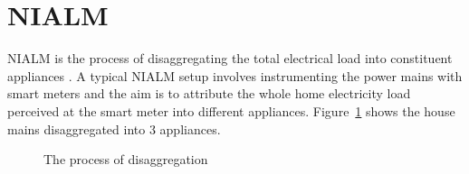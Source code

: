 \documentclass[conference]{IEEEtran}
\newcommand{\figref}[1]{Figure~\ref{#1}}
\begin{document}
\section{NIALM}
NIALM is the process of disaggregating the total electrical load into constituent appliances \cite{hart}. A typical NIALM setup involves instrumenting the power mains with smart meters and the aim is to attribute the whole home electricity load perceived at the smart meter into different appliances. \figref{fig:disagg} shows the house mains disaggregated into 3 appliances.

\begin{figure} 
	
  	\caption{The process of disaggregation}
    \label{fig:disagg}
\end{figure}
\end{document}
